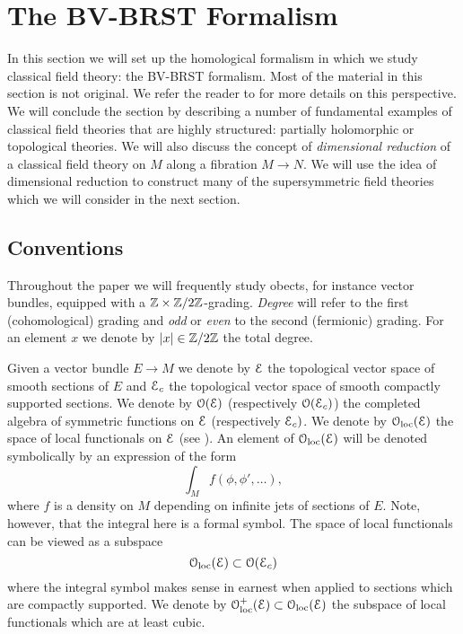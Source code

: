 \documentclass[10pt, oneside]{article}
\begin{document}
\section{The BV-BRST Formalism} \label{BV_section}

In this section we will set up the homological formalism in which we study classical field theory: the BV-BRST formalism.  Most of the material in this section is not original.  We refer the reader to \cite{CostelloBook, Book2} for more details on this perspective.  We will conclude the section by describing a number of fundamental examples of classical field theories that are highly structured: partially holomorphic or topological theories.  We will also discuss the concept of \emph{dimensional reduction} of a classical field theory on $M$ along a fibration $M \to N$.  We will use the idea of dimensional reduction to construct many of the supersymmetric field theories which we will consider in the next section.  

\subsection{Conventions}
Throughout the paper we will frequently study obects, for instance vector bundles, equipped with a $\mathbb Z\times\mathbb Z/2\mathbb Z$-grading. \emph{Degree} will refer to the first (cohomological) grading and \emph{odd} or \emph{even} to the second (fermionic) grading.  For an element $x$ we denote by $|x|\in\mathbb Z/2\mathbb Z$ the total degree.

Given a vector bundle $E\rightarrow M$ we denote by $\mathcal E$ the topological vector space of smooth sections of $E$ and $\mathcal E_c$ the topological vector space of smooth compactly supported sections.
We denote by $\mathcal O(\mathcal E)$ (respectively $\mathcal O(\mathcal E_c)$) the completed algebra of symmetric functions on $\mathcal E$ (respectively $\mathcal E_c)$. 
We denote by $\mathcal{O}_{\rm loc}(\mathcal E)$ the space of local functionals on $\mathcal E$ (see \cite[Definition 4.5.1.1]{Book2}). An element of $\mathcal{O}_{\rm loc}(\mathcal E)$ will be denoted symbolically by an expression of the form
\[\int_M f (\phi, \phi', \dots),\]
where $f$ is a density on $M$ depending on infinite jets of sections of $E$. Note, however, that the integral here is a formal symbol. 
The space of local functionals can be viewed as a subspace
\[
\mathcal{O}_{\rm loc}(\mathcal E) \subset \mathcal O(\mathcal E_c)
\]
where the integral symbol makes sense in earnest when applied to sections which are compactly supported.
We denote by $\mathcal{O}_{\rm loc}^+(\mathcal E)\subset \mathcal{O}_{\rm loc}(\mathcal E)$ the subspace of local functionals which are at least cubic.
\end{document}
